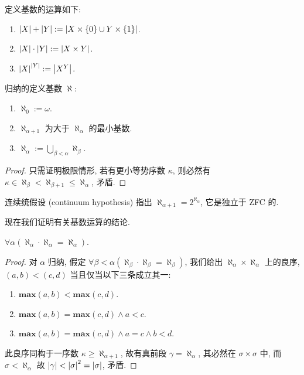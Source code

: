 定义基数的运算如下:

\begin{definition}
    \begin{enumerate}
        \item \(\abs{X} + \abs{Y} := \abs{X \times \{0\} \cup Y \times \{1\}}\).
        \item \(\abs{X} \cdot \abs{Y} := \abs{X \times Y}\).
        \item \(\abs{X}^\abs{Y} := \abs{X^Y}\).
    \end{enumerate}
\end{definition}


\begin{definition}
    \label{definition:aleph}
    归纳的定义基数 \(\aleph\):
    \begin{enumerate}
        \item \(\aleph_0 := \omega\).
        \item \(\aleph_{\alpha + 1}\) 为大于 \(\aleph_\alpha\) 的最小基数.
        \item \(\aleph_\alpha := \bigcup_{\beta < \alpha} \aleph_\beta\).
    \end{enumerate}

    \begin{proof}
        只需证明极限情形, 若有更小等势序数 \(\kappa\), 则必然有 \(\kappa \in \aleph_\beta < \aleph_{\beta + 1} \le \aleph_{\alpha}\), 矛盾.
    \end{proof}
\end{definition}

\begin{hypnosis}
    连续统假设 (continuum hypothesis) 指出 \(\aleph_{\alpha + 1} = 2^{\aleph_\alpha}\),
    它是独立于 ZFC 的.
\end{hypnosis}

现在我们证明有关基数运算的结论.

\begin{theorem}
    \label{theorem:cardinal multiplication}
    \(\forall \alpha (\aleph_\alpha \cdot \aleph_\alpha = \aleph_\alpha)\).

    \begin{proof}
        对 \(\alpha\) 归纳, 假定 \(\forall \beta < \alpha (\aleph_\beta \cdot \aleph_\beta = \aleph_\beta)\),
        我们给出 \(\aleph_\alpha \times \aleph_\alpha\) 上的良序, \((a,b) < (c,d)\) 当且仅当以下三条成立其一:

        \begin{enumerate}
            \item \(\mathbf{max} (a,b) < \mathbf{max} (c,d)\).
            \item \(\mathbf{max} (a,b) = \mathbf{max} (c,d) \land a < c\).
            \item \(\mathbf{max} (a,b) = \mathbf{max} (c,d) \land a = c \land b < d\).
        \end{enumerate}

        此良序同构于一序数 \(\kappa \ge \aleph_{\alpha + 1}\), 故有真前段 \(\gamma = \aleph_{\alpha}\), 其必然在 \(\sigma \times \sigma\) 中,
        而 \(\sigma < \aleph_\alpha\) 故 \(\abs{\gamma} < \abs{\sigma}^2 = \abs{\sigma}\), 矛盾.
    \end{proof}
\end{theorem}


